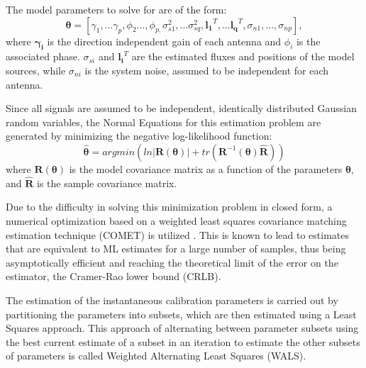 \documentclass{aa}
\begin{document}
The model parameters to solve for are of the form:
\begin{equation}
\bm{\theta}=[\gamma_{1},\ldots\gamma_{p},\phi_{2}...,\phi_{p,}\sigma_{s1}^{2},...\sigma_{sq}^{2},\mathbf{l_{1}}^{T},...\mathbf{l_{q}}^{T},\sigma_{n1},...,\sigma_{np}],\label{eq:estparam}
\end{equation}
 where $\mathbf{\gamma_{i}}$  is the direction independent gain  of each antenna
 and $\phi_{i}$  is the  associated phase. $\sigma_{si}$  and $\mathbf{l_i}^{T}$
 are  the   estimated  fluxes  and   positions  of  the  model   sources,  while
 $\sigma_{ni}$ is the system noise, assumed to be independent for each antenna.

Since  all  signals  are  assumed  to be  independent,  identically  distributed
Gaussian random variables, the Normal  Equations for this estimation problem are
generated by minimizing the negative log-likelihood function:
\begin{equation}
\bm{\hat{\theta}}=argmin\left(ln|\bm{R(\theta)}|+tr(\mathbf{R}^{-1}(\bm{\theta})\mathbf{\widehat{R}})\right)\label{eq:normeq}
\end{equation}
 where  $\bm{R(\theta)}$  is  the  model  covariance  matrix  as  a
 function of  the parameters $\bm{\theta}$,  and $\mathbf{\widehat{R}}$ is
 the sample covariance matrix.

Due to  the difficulty in  solving this minimization  problem in closed  form, a
numerical  optimization based on  a weighted  least squares  covariance matching
estimation technique (COMET)  is utilized \citep{ottersten1998covariance}.  This
is known to  lead to estimates that  are equivalent to ML estimates  for a large
number  of  samples,  thus  being  asymptotically  efficient  and  reaching  the
theoretical  limit of the  error on  the estimator,  the Cramer-Rao  lower bound
(CRLB).

The estimation  of the  instantaneous calibration parameters  is carried  out by
partitioning the parameters into subsets, which are then estimated using a Least
Squares approach.  This approach  of alternating between parameter subsets using
the best  current estimate  of a subset  in an  iteration to estimate  the other
subsets of parameters is called Weighted Alternating Least Squares (WALS).
\end{document}
